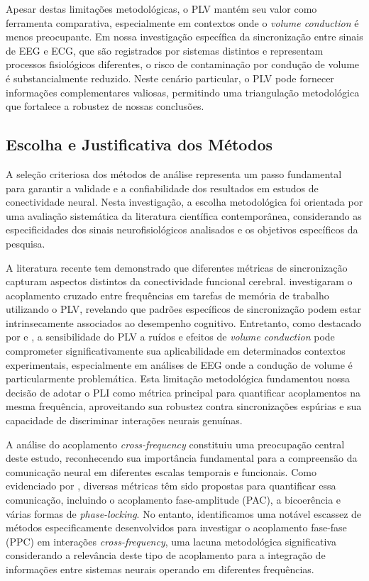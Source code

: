 Apesar destas limitações metodológicas, o PLV mantém seu valor como ferramenta comparativa, especialmente em contextos onde o \textit{volume conduction} é menos preocupante. Em nossa investigação específica da sincronização entre sinais de EEG e ECG, que são registrados por sistemas distintos e representam processos fisiológicos diferentes, o risco de contaminação por condução de volume é substancialmente reduzido. Neste cenário particular, o PLV pode fornecer informações complementares valiosas, permitindo uma triangulação metodológica que fortalece a robustez de nossas conclusões.


\subsection{Escolha e Justificativa dos Métodos}
A seleção criteriosa dos métodos de análise representa um passo fundamental para garantir a validade e a confiabilidade dos resultados em estudos de conectividade neural. Nesta investigação, a escolha metodológica foi orientada por uma avaliação sistemática da literatura científica contemporânea, considerando as especificidades dos sinais neurofisiológicos analisados e os objetivos específicos da pesquisa.

A literatura recente tem demonstrado que diferentes métricas de sincronização capturam aspectos distintos da conectividade funcional cerebral.  investigaram o acoplamento cruzado entre frequências em tarefas de memória de trabalho utilizando o PLV, revelando que padrões específicos de sincronização podem estar intrinsecamente associados ao desempenho cognitivo. Entretanto, como destacado por  e , a sensibilidade do PLV a ruídos e efeitos de \textit{volume conduction} pode comprometer significativamente sua aplicabilidade em determinados contextos experimentais, especialmente em análises de EEG onde a condução de volume é particularmente problemática. Esta limitação metodológica fundamentou nossa decisão de adotar o PLI como métrica principal para quantificar acoplamentos na mesma frequência, aproveitando sua robustez contra sincronizações espúrias e sua capacidade de discriminar interações neurais genuínas.

A análise do acoplamento \textit{cross-frequency} constituiu uma preocupação central deste estudo, reconhecendo sua importância fundamental para a compreensão da comunicação neural em diferentes escalas temporais e funcionais. Como evidenciado por , diversas métricas têm sido propostas para quantificar essa comunicação, incluindo o acoplamento fase-amplitude (PAC), a bicoerência e várias formas de \textit{phase-locking}. No entanto, identificamos uma notável escassez de métodos especificamente desenvolvidos para investigar o acoplamento fase-fase (PPC) em interações \textit{cross-frequency}, uma lacuna metodológica significativa considerando a relevância deste tipo de acoplamento para a integração de informações entre sistemas neurais operando em diferentes frequências.

